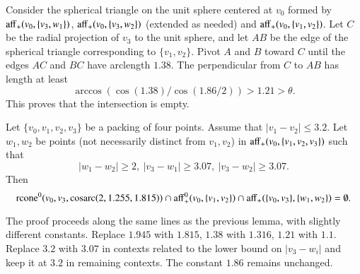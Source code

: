 \begin{tarskidata}
\begin{tarski}
\begin{proved}
Consider the spherical triangle on the unit sphere centered at $v_0$
formed by
 ${\operatorname{aff}}_+(v_0,\{v_3,w_1\})$, ${\operatorname{aff}}_+(v_0,\{v_3,w_2\})$ 
(extended as needed) and ${\operatorname{aff}}_+(v_0,\{v_1,v_2\})$. 
Let $C$ be the radial projection of
$v_3$ to the unit sphere, 
and let $AB$ be the edge of the spherical triangle corresponding to
$\{v_1,v_2\}$. Pivot $A$ and $B$ toward $C$ until the edges $AC$ and
$BC$ have arclength $1.38$.  The perpendicular from $C$ to $AB$
has length at least
    $$\arccos(\cos(1.38)/\cos(1.86/2))>1.21>\theta .$$
This proves that the intersection is empty.
\swallowed\end{proved}
\end{tarski}




\begin{tarski}

\begin{lemma}
Let $\{v_0,v_1,v_2,v_3\}$ be a packing of four points.
Assume that $|v_1-v_2|\le 3.2$.  Let $w_1,w_2$ be points (not necessarily
distinct from $v_1,v_2$)
in ${\operatorname{aff}}_+(v_0,\{v_1,v_2,v_3\})$ such that
  $$|w_1-w_2|\ge 2,\ |v_3-w_1|\ge 3.07,\ |v_3-w_2|\ge 3.07.
  $$
Then 
  $${\operatorname{rcone}}^0(v_0,v_3,\operatorname{cosarc}(2,1.255,1.815)) \cap {\operatorname{aff}}_+^0(v_0,\{v_1,v_2\})
  \cap {\operatorname{aff}}_+(\{v_0,v_3\},\{w_1,w_2\})
=\emptyset .
  $$
\end{lemma}

\begin{proved}
The proof proceeds along the same lines as the previous lemma, with
slightly different constants. Replace $1.945$ with $1.815$, $1.38$ with
$1.316$, $1.21$ with $1.1$. Replace $3.2$ with $3.07$ in contexts related
to the lower bound on $|v_3-w_i|$ and keep it at $3.2$ in
remaining contexts. The constant $1.86$ remains unchanged.
\swallowed\end{proved}
\end{tarski}



\begin{tarski}


\end{tarski}
\end{tarskidata}
